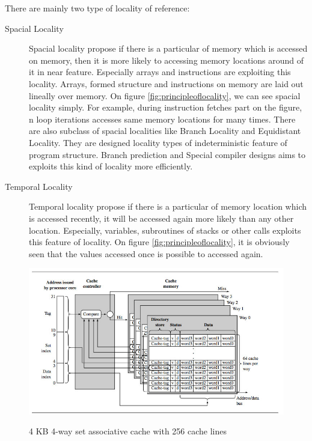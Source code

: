 \documentclass[informationsecurity]{gucmasterproject}
\begin{document}
There are mainly two type of locality of reference:

\begin{description}
\item[Spacial Locality] Spacial locality propose if there is a particular of memory which is accessed on memory, then it is more likely to accessing memory locations around of it in near feature. Especially arrays and instructions are exploiting this locality. Arrays, formed structure and instructions on memory are laid out lineally over memory. On figure \ref{fig:principleoflocality}, we can see spacial locality simply.  For example, during instruction fetches part on the figure, n loop iterations accesses same memory locations for many times.  There are also subclass of spacial localities like Branch Locality and Equidistant Locality. They are designed locality types of indeterministic feature of program structure. Branch prediction and Special compiler designs aims to exploits this kind of locality more efficiently.
\item[Temporal Locality] Temporal locality propose if there is a particular of memory location which is accessed recently, it will be accessed again more likely than any other location. Especially, variables, subroutines of stacks or other calls exploits this feature of locality. On figure \ref{fig:principleoflocality}, it is obviously seen that the values accessed once is possible to accessed again. 
\end{description}

\begin{figure}[h!]
    \centering
    \includegraphics[width=1\textwidth]{cacheinternals.jpg}
    \caption{4 KB 4-way set associative cache with 256 cache lines }
    \cite{sloss2004arm}
    \label{fig:cacheinternals}
\end{figure}
\end{document}
